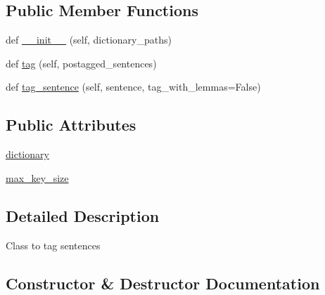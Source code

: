 \subsection*{Public Member Functions}
\begin{DoxyCompactItemize}
\item 
def \mbox{\hyperlink{class_data_tools_1_1language__datatools_1_1_dictionary_tagger_aae9f9cb588573d5f877d251f23b515f0}{\+\_\+\+\_\+init\+\_\+\+\_\+}} (self, dictionary\+\_\+paths)
\item 
def \mbox{\hyperlink{class_data_tools_1_1language__datatools_1_1_dictionary_tagger_aa15c0e987509a72cb7ecc9c0a5ff39d7}{tag}} (self, postagged\+\_\+sentences)
\item 
def \mbox{\hyperlink{class_data_tools_1_1language__datatools_1_1_dictionary_tagger_ac5656960ce6b5a95d59cbc3df1b2332b}{tag\+\_\+sentence}} (self, sentence, tag\+\_\+with\+\_\+lemmas=False)
\end{DoxyCompactItemize}
\subsection*{Public Attributes}
\begin{DoxyCompactItemize}
\item 
\mbox{\hyperlink{class_data_tools_1_1language__datatools_1_1_dictionary_tagger_a0e92e742ab9322b06e49ce94a2008d3f}{dictionary}}
\item 
\mbox{\hyperlink{class_data_tools_1_1language__datatools_1_1_dictionary_tagger_ab3da30a484af2afac14caa6cfb31729d}{max\+\_\+key\+\_\+size}}
\end{DoxyCompactItemize}


\subsection{Detailed Description}
\begin{DoxyVerb}    Class to tag sentences
\end{DoxyVerb}
 

\subsection{Constructor \& Destructor Documentation}
\mbox{\label{class_data_tools_1_1language__datatools_1_1_dictionary_tagger_aae9f9cb588573d5f877d251f23b515f0}} 
